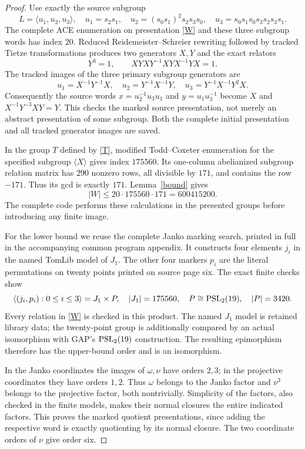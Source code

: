 \begin{proof}
Use exactly the source subgroup
\[
 L=\langle u_1,u_2,u_3\rangle,\quad
 u_1=s_2s_1,\quad u_2=(s_0s_1)^2s_2s_3s_0,\quad
 u_3=s_0s_1s_0s_3s_2s_3s_1.
\]
The complete ACE enumeration on presentation \eqref{W} and these three subgroup words has index $20$. Reduced Reidemeister--Schreier rewriting followed by tracked Tietze transformations produces two generators $X,Y$ and the exact relators
\begin{equation}\label{T}
 Y^3=1,\qquad XYXY^{-1}XYX^{-1}YX=1.
\end{equation}
The tracked images of the three primary subgroup generators are
\[
 u_1=X^{-1}Y^{-1}X,\quad u_2=Y^{-1}X^{-1}Y,
 \quad u_3=Y^{-1}X^{-1}Y^2X.
\]
Consequently the source words $x=u_2^{-1}u_3u_1$ and $y=u_1u_3^{-1}$ become $X$ and $X^{-1}Y^{-3}XY=Y$. This checks the marked source presentation, not merely an abstract presentation of some subgroup. Both the complete initial presentation and all tracked generator images are saved.

In the group $T$ defined by \eqref{T}, modified Todd--Coxeter enumeration for the specified subgroup $\langle X\rangle$ gives index $175560$. Its one-column abelianized subgroup relation matrix has $290$ nonzero rows, all divisible by $171$, and contains the row $-171$. Thus its gcd is exactly $171$. Lemma~\ref{bound} gives
\[
 |W|\leq20\cdot175560\cdot171=600415200.
\]
The complete code performs these calculations in the presented groups before introducing any finite image.

For the lower bound we reuse the complete Janko marking search, printed in full in the accompanying common program appendix. It constructs four elements $j_i$ in the named TomLib model of $J_1$. The other four markers $p_i$ are the literal permutations on twenty points printed on source page six. The exact finite checks show
\[
 \langle(j_i,p_i):0\leq i\leq3\rangle=J_1\times P,
 \quad |J_1|=175560,\quad P\cong\operatorname{PSL}_2(19),\quad |P|=3420.
\]
Every relation in \eqref{W} is checked in this product. The named $J_1$ model is retained library data; the twenty-point group is additionally compared by an actual isomorphism with GAP's $\operatorname{PSL}_2(19)$ construction. The resulting epimorphism therefore has the upper-bound order and is an isomorphism.

In the Janko coordinates the images of $\omega,\nu$ have orders $2,3$; in the projective coordinates they have orders $1,2$. Thus $\omega$ belongs to the Janko factor and $\nu^3$ belongs to the projective factor, both nontrivially. Simplicity of the factors, also checked in the finite models, makes their normal closures the entire indicated factors. This proves the marked quotient presentations, since adding the respective word is exactly quotienting by its normal closure. The two coordinate orders of $\nu$ give order six.
\end{proof}

